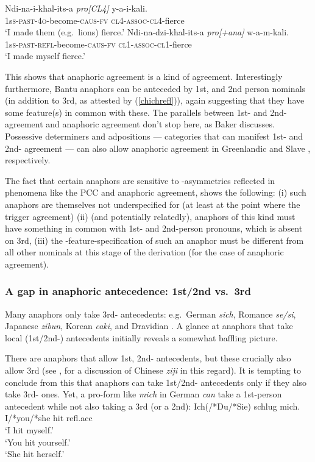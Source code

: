 \documentclass[output=paper, modfonts, nonflat]{langsci/langscibook}
\begin{document}
\ea\label{chichadj}\gll Ndi-na-i-khal-its-a \textit{pro[CL4]} y-a-i-kali.\\
1s\textsc{s}-\textsc{past-4o}-become-\textsc{caus-fv} {} \textsc{cl4-assoc-cl4}-fierce\\
\glt `I made them (e.g.\ lions) fierce.'
\ex\label{chichrefl}\gll Ndi-na-dzi-khal-its-a \textit{pro[+ana]} w-a-m-kali.\\
1s\textsc{s}-\textsc{past-refl-}become-\textsc{caus-fv} {} \textsc{cl1-assoc-cl1-}fierce\\
\glt `I made myself fierce.'
\z

\noindent This shows that anaphoric agreement is a kind of \person{}
agreement. Interestingly furthermore, Bantu anaphors can be anteceded
by 1st, and 2nd person nominals (in addition to 3rd, as attested by
(\ref{chichrefl})), again suggesting that they have some feature(s) in
common with these. The parallels between 1st- and 2nd-\person{}
agreement and anaphoric agreement don't stop here, as Baker
discusses. Possessive determiners and adpositions --- categories that
can manifest 1st- and 2nd-\person{} agreement --- can also allow
anaphoric agreement in Greenlandic \citep{bittner:1994} and Slave
\citep{rice:1989}, respectively.


The fact that certain anaphors are sensitive to \person-asymmetries
reflected in phenomena like the PCC and anaphoric agreement, shows the
following: (i) such anaphors are themselves not underspecified for
\person{} (at least at the point where the trigger agreement) (ii)
(and potentially relatedly), anaphors of this kind must have something
in common with 1st- and 2nd-person pronouns, which is absent on 3rd,
(iii) the \ph-feature-specification of such an anaphor must be
different from all other nominals at this stage of the derivation (for
the case of anaphoric agreement). 

\subsubsection{A gap in anaphoric antecedence: 1st/2nd vs.\ 3rd}

Many anaphors only take 3rd-\person{} antecedents: e.g.\ German
\textit{sich}, Romance \textit{se/si}, Japanese \textit{zibun}, Korean
\textit{caki}, and Dravidian \taan. A glance at anaphors that take
local (1st/2nd-\person) antecedents initially reveals a somewhat
baffling picture.

There are anaphors that allow 1st, 2nd-\person{} antecedents, but
these crucially also allow 3rd (see \citealt{huangliu:2001}, for a
discussion of Chinese \textit{ziji} in this
regard). It is tempting to conclude from this that anaphors can take
1st/2nd-\person{} antecedents only if they also take 3rd-\person{}
ones.  Yet, a pro-form like \textit{mich} in German \emph{can} take a
1st-person antecedent while not also taking a 3rd (or a 2nd):
\ea\label{ichgood}\gll Ich(/*Du/*Sie) schlug mich.\\
I/*you/*she hit refl.{\sc acc}\\
\glt `I hit myself.'\\
 `You hit yourself.'\\
 `She hit herself.'  \z
\end{document}
